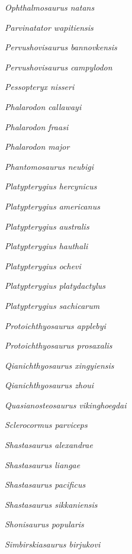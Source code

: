 \emph{Ophthalmosaurus natans}~\cite{Marsh1879AMNH}

\emph{Parvinatator wapitiensis}~\cite{Nicholls1995Vfateosc}

\emph{Pervushovisaurus bannovkensis}~\cite{Arkhangelsky1998PJ}

\emph{Pervushovisaurus campylodon}~\cite{Carter1846RBAAS}

\emph{Pessopteryx nisseri}~\cite{Wiman1910BGIUa}

\emph{Phalarodon callawayi}~\cite{Schmitz2004PAP}

\emph{Phalarodon fraasi}~\cite{Merriam1910UCBDG}

\emph{Phalarodon major}~\cite{vonHuene1916P}

\emph{Phantomosaurus neubigi}~\cite{Sander1997AMR}

\emph{Platypterygius  hercynicus}~\cite{Kuhn1946BNGBb}

\emph{Platypterygius americanus}~\cite{Nace1939AJS}

\emph{Platypterygius australis}~\cite{MCoy1867AMNH}

\emph{Platypterygius hauthali}~\cite{vonHuene1927ZFMGPB}

\emph{Platypterygius ochevi}~\cite{Arkhangelsky2008PJ}

\emph{Platypterygius platydactylus}~\cite{Broili1907P}

\emph{Platypterygius sachicarum}~\cite{Paramo1997RI}

\emph{Protoichthyosaurus applebyi}~\cite{Lomax2017JVP}

\emph{Protoichthyosaurus prosaxalis}~\cite{Appleby1979P}

\emph{Qianichthyosaurus xingyiensis}~\cite{Yang2013ASNUP}

\emph{Qianichthyosaurus zhoui}~\cite{Li1999CSB}

\emph{Quasianosteosaurus vikinghoegdai}~\cite{Maisch2003NJGPAa}

\emph{Sclerocormus parviceps}~\cite{Jiang2016SR}

\emph{Shastasaurus alexandrae}~\cite{Merriam1902UCBDG}

\emph{Shastasaurus liangae}~\cite{Yin2000GG}

\emph{Shastasaurus pacificus}~\cite{Merriam1895AJS}

\emph{Shastasaurus sikkaniensis}~\cite{Nicholls2004JVP}

\emph{Shonisaurus popularis}~\cite{Camp1976SOeAW}

\emph{Simbirskiasaurus birjukovi}~\cite{Otschev1985PZ}

